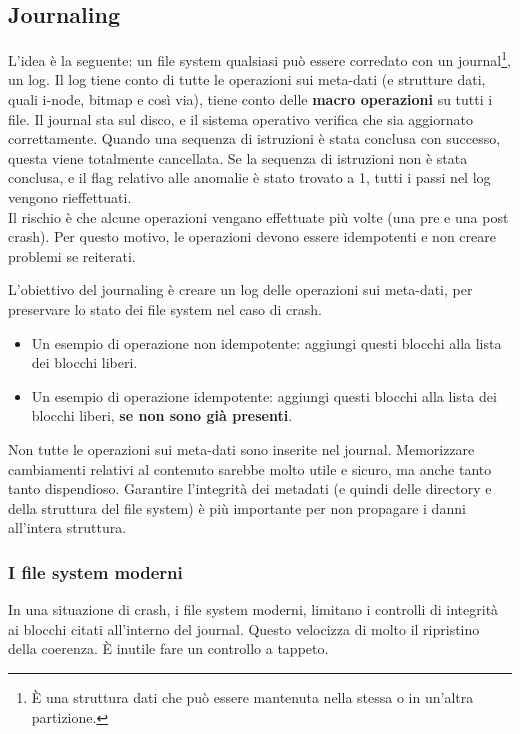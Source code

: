 \documentclass{report}
\begin{document}
\subsection{Journaling}
L'idea è la seguente: un file system qualsiasi può essere corredato con un journal\footnote{È una struttura dati che può essere mantenuta nella stessa o in un'altra partizione.}, un log. Il log tiene conto di tutte le operazioni sui meta-dati (e strutture dati, quali i-node, bitmap e così via), tiene conto delle \textbf{macro operazioni} su tutti i file. Il journal sta sul disco, e il sistema operativo verifica che sia aggiornato correttamente. Quando una sequenza di istruzioni è stata conclusa con successo, questa viene totalmente cancellata. Se la sequenza di istruzioni non è stata conclusa, e il flag relativo alle anomalie è stato trovato a 1, tutti i passi nel log vengono rieffettuati.\\
Il rischio è che alcune operazioni vengano effettuate più volte (una pre e una post crash). Per questo motivo, le operazioni devono essere idempotenti e non creare problemi se reiterati.

L'obiettivo del journaling è creare un log delle operazioni sui meta-dati, per preservare lo stato dei file system nel caso di crash.

\begin{itemize}
    \item Un esempio di operazione non idempotente: aggiungi questi blocchi alla lista dei blocchi liberi.
    \item Un esempio di operazione idempotente: aggiungi questi blocchi alla lista dei blocchi liberi, \textbf{se non sono già presenti}.
\end{itemize}

Non tutte le operazioni sui meta-dati sono inserite nel journal. Memorizzare cambiamenti relativi al contenuto sarebbe molto utile e sicuro, ma anche tanto tanto dispendioso. Garantire l'integrità dei metadati (e quindi delle directory e della struttura del file system) è più importante per non propagare i danni all'intera struttura.

\subsubsection{I file system moderni}
In una situazione di crash, i file system moderni, limitano i controlli di integrità ai blocchi citati all'interno del journal. Questo velocizza di molto il ripristino della coerenza. È inutile fare un controllo a tappeto.
\end{document}
